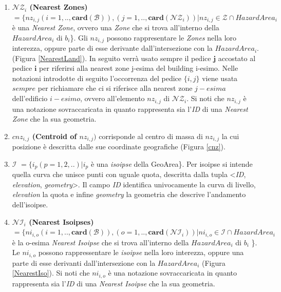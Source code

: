 \begin{enumerate}
	\item \textbf{$ \mathcal{NZ}_i $ (Nearest Zones)} $ = \{nz_{i,j}(i=1,..,\mathbf{card}( \mathcal{B} )), (j=1,..,\mathbf{card}(\mathcal{ NZ}_i)) | nz_{i,j} \in  \mathcal{Z}  \cap HazardArea_i $ è una \textit{Nearest Zone}, ovvero 	una \textit{Zone} che si trova all'interno della $HazardArea_i$ di $b_i$\}. Gli $nz_{i,j}$ possono rappresentare le \textit{Zones} nella loro interezza, oppure parte di esse derivante dall'intersezione con la $HazardArea_i$.  (Figura \ref{NearestLand}).
	In seguito verrà usato sempre il pedice $\mathbf{j}$ accostato al pedice $\mathbf{i}$ per riferirsi alla nearest zone j-esima del building i-esimo.
	Nelle notazioni introdotte di seguito l'occorrenza del pedice $\{i,j\}$ viene usata $sempre$ per richiamare che ci si riferisce alla nearest zone $j-esima$ dell'edificio $i-esimo$, ovvero all'elemento $nz_{i,j}$ di $ \mathcal{NZ}_i $.
	Si noti che $nz_{i,j}$ è una notazione sovraccaricata in quanto rappresenta sia l’\textit{ID} di una \textit{Nearest Zone} che la sua geometria.
	
	\item \textbf{$ cnz_{i,j} $ (Centroid of $nz_{i,j})$} corrisponde al centro di massa di $nz_{i,j}$ la cui posizione è descritta dalle sue coordinate geografiche (Figura \ref{cnz}). 
	
	\item \textbf{$ \mathcal{I} $} $ = \{i_p(p=1,2,..) | i_p $ \`e una \textit{isoipse} della GeoArea\}. Per isoipse si intende quella curva che unisce punti con uguale quota, descritta dalla tupla <\textit{ID}, \textit{elevation}, \textit{geometry}>. Il campo \textit{ID} identifica univocamente la curva di livello, \textit{elevation} la quota  e infine \textit{geometry} la geometria che descrive l'andamento dell'isoipse.
	
	\item \textbf{$ \mathcal{NI}_i $ (Nearest Isoipses)} $ = \{ ni_{i,o}(i=1,..,\mathbf{card}( \mathcal{B} )), (o=1,. . ,\mathbf{card}(\mathcal{ NI}_i)) | ni_{i,o} \in  \mathcal{I}  \cap HazardArea_i$ è la o-esima \textit{Nearest Isoipse} che si trova all'interno della $HazardArea_i$ di $b_i$ \}. Le $ni_{i,o}$ possono rappressentare le \textit{isoipse} nella loro interezza, oppure una parte di esse derivanti dall'intersezione con la $HazardArea_i$  (Figura \ref{NearestIso}). Si noti che $ni_{i,o}$ è una notazione sovraccaricata in quanto rappresenta sia l’\textit{ID} di una \textit{Nearest Isoipse} che la sua geometria.
	

\end{enumerate}
